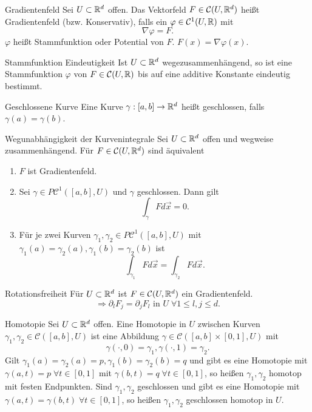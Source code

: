 \documentclass[main.tex]{subfiles}
\begin{document}
\begin{karte}{Gradientenfeld}
    Sei \(U \subset \mathbb{R}^d\) offen. Das Vektorfeld \(F \in \mathcal{C}(U,\mathbb{R}^d)\)
    heißt Gradientenfeld (bzw. Konservativ),
    falls ein \(\varphi \in \mathcal{C}^1(U, \mathbb{R})\) mit 
    \[ \nabla \varphi = F. \] 
    \(\varphi\) heißt Stammfunktion oder Potential von \(F\). 
    \( F(x) = \nabla \varphi (x) \).
\end{karte}

\begin{karte}{Stammfunktion Eindeutigkeit}
    Ist \( U \subset \mathbb{R}^d \) wegezusammenhängend, so 
    ist eine Stammfunktion \( \varphi \) von \( F \in \mathcal{C}(U, \mathbb{R}) \) 
    bis auf eine additive Konstante eindeutig bestimmt.
\end{karte}

\begin{karte}{Geschlossene Kurve}
    Eine Kurve \(\gamma : [a,b] \rightarrow \mathbb{R}^d\)
    heißt geschlossen, falls \(\gamma(a) = \gamma(b)\).
\end{karte}

\begin{karte}{Wegunabhängigkeit der Kurvenintegrale}
    Sei \( U \subset \mathbb{R}^d\) offen und wegweise zusammenhängend.
    Für \( F \in \mathcal{C}(U, \mathbb{R}^d) \) sind äquivalent
    \begin{enumerate}
        \item \( F \) ist Gradientenfeld.
        \item Sei \(\gamma \in P\mathcal{C}^1([a,b], U)\) und 
        \(\gamma\) geschlossen. Dann gilt 
        \[ \int_\gamma F d\vec{x} = 0. \]
        \item  Für je zwei Kurven \(\gamma_1, \gamma_2 \in P\mathcal{C}^1([a,b],U)\)
        mit \(\gamma_1(a) = \gamma_2(a), \gamma_1(b) = \gamma_2(b)\) ist    
        \[ \int_{\gamma_1} F d\vec{x} = \int_{\gamma_2} F d\vec{x}. \]
    \end{enumerate}
\end{karte}

\begin{karte}{Rotationsfreiheit}
    Für \( U \subset \mathbb{R}^d \) ist \( F \in \mathcal{C}(U, \mathbb{R}^d) \)
    ein Gradientenfeld.
    \[ \Rightarrow \partial_l F_j 
    = \partial_j F_l \text{ in } U 
    \;\forall 1 \leq l,j \leq d. \]
\end{karte}

\begin{karte}{Homotopie}
    Sei \(U \subset \mathbb{R}^d\) offen. Eine Homotopie in \(U\)
    zwischen Kurven \(\gamma_1, \gamma_2 \in \mathcal{C}([a,b], U) \)
    ist eine Abbildung \(\gamma \in \mathcal{C}([a,b]\times [0,1], U)\) mit
    \[ \gamma(\cdot, 0) = \gamma_1, \gamma(\cdot, 1) = \gamma_2. \]
    Gilt \( \gamma_1(a) = \gamma_2(a) = p, 
    \gamma_1(b) = \gamma_2(b) = q \) und gibt es eine Homotopie mit    
    \(\gamma(a,t) = p \; \forall t \in [0,1]\) mit 
    \(\gamma(b,t) = q \; \forall t \in [0,1]\), so heißen \(\gamma_1, \gamma_2\)
    homotop mit festen Endpunkten. Sind \( \gamma_1, \gamma_2 \)
    geschlossen und gibt es eine Homotopie mit 
    \(\gamma(a, t) = \gamma(b,t) \; \forall t \in [0,1]\),
    so heißen \(\gamma_1, \gamma_2\) geschlossen homotop in \(U\).
\end{karte}
\end{document}
